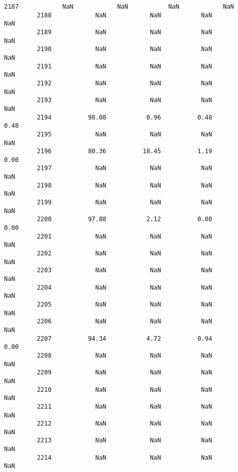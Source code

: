 \documentclass[11pt]{llncs}
\begin{document}
\begin{Verbatim}[commandchars=\\\{\}]
         2187            NaN            NaN           NaN            NaN   
         2188            NaN            NaN           NaN            NaN   
         2189            NaN            NaN           NaN            NaN   
         2190            NaN            NaN           NaN            NaN   
         2191            NaN            NaN           NaN            NaN   
         2192            NaN            NaN           NaN            NaN   
         2193            NaN            NaN           NaN            NaN   
         2194          98.08           0.96          0.48           0.48   
         2195            NaN            NaN           NaN            NaN   
         2196          80.36          18.45          1.19           0.00   
         2197            NaN            NaN           NaN            NaN   
         2198            NaN            NaN           NaN            NaN   
         2199            NaN            NaN           NaN            NaN   
         2200          97.88           2.12          0.00           0.00   
         2201            NaN            NaN           NaN            NaN   
         2202            NaN            NaN           NaN            NaN   
         2203            NaN            NaN           NaN            NaN   
         2204            NaN            NaN           NaN            NaN   
         2205            NaN            NaN           NaN            NaN   
         2206            NaN            NaN           NaN            NaN   
         2207          94.34           4.72          0.94           0.00   
         2208            NaN            NaN           NaN            NaN   
         2209            NaN            NaN           NaN            NaN   
         2210            NaN            NaN           NaN            NaN   
         2211            NaN            NaN           NaN            NaN   
         2212            NaN            NaN           NaN            NaN   
         2213            NaN            NaN           NaN            NaN   
         2214            NaN            NaN           NaN            NaN   
         

\end{Verbatim}
\end{document}
